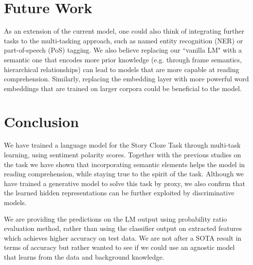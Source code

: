 \documentclass{article}
\begin{document}
\section{Future Work}
As an extension of the current model, one could also think of integrating further tasks to the multi-tasking approach, such as named entity recognition (NER) or part-of-speech (PoS) tagging. We also believe replacing our ``vanilla LM" with a semantic one that encodes more prior knowledge (e.g. through frame semantics, hierarchical relationships) can lead to models that are more capable at reading comprehension. Similarly, replacing the embedding layer with more powerful word embeddings that are trained on larger corpora could be beneficial to the model.

\section{Conclusion}
We have trained a language model for the Story Cloze Task through multi-task learning, using sentiment polarity scores. Together with the previous studies on the task we have shown that incorporating semantic elements helps the model in reading comprehension, while staying true to the spirit of the task. Although we have trained a generative model to solve this task by proxy, we also confirm that the learned hidden representations can be further exploited by discriminative models.
\par We are providing the predictions on the LM output using probability ratio evaluation method, rather than using the classifier output on extracted features which achieves higher accuracy on test data. We are not after a SOTA result in terms of accuracy but rather wanted to see if we could use an agnostic model that learns from the data and background knowledge.



\end{document}
